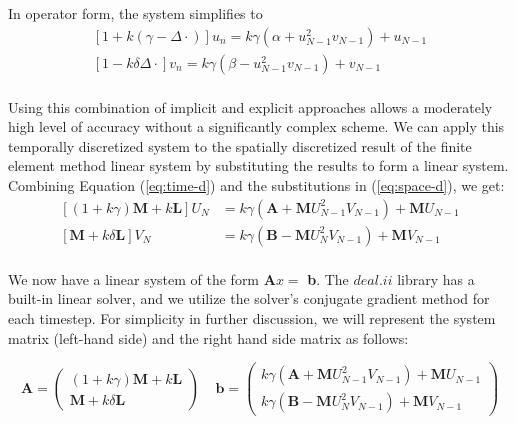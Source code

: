 \documentclass[12pt]{article}
\begin{document}
\noindent In operator form, the system simplifies to
\begin{equation}\label{eq:time-d}
\begin{aligned}
\left[1 + k\left(\gamma - \Delta\cdot\right)\right]u_n=  k\gamma\left(\alpha + u_{N-1}^2v_{N-1} \right) + u_{N-1} \\
\left[1 - k\delta\Delta\cdot\right] v_n=  k\gamma\left(\beta - u_{N-1}^2v_{N-1} \right) + v_{N-1} \\
\end{aligned}
\end{equation}

Using this combination of implicit and explicit approaches allows a moderately high level of accuracy without a significantly complex scheme. We can apply this temporally discretized system to the spatially discretized result of the finite element method linear system by substituting the results to form a linear system. Combining Equation (\ref{eq:time-d}) and the substitutions in (\ref{eq:space-d}), we get:
\begin{equation}
\begin{aligned}
\left[(1+k\gamma)\textbf{M} + k\textbf{L}\right] U_N&=  k\gamma\left(\textbf{A} + \textbf{M} U^2_{N-1}V_{N-1} \right) + \textbf{M}U_{N-1} \\
\left[\textbf{M} + k\delta\textbf{L}\right] V_N&=  k\gamma\left(\textbf{B} - \textbf{M} U^2_NV_{N-1} \right) + \textbf{M}V_{N-1} \\
\end{aligned}
\end{equation}

We now have a linear system of the form \textbf{A}$x=$ \textbf{b}. The $deal.ii$ library has a built-in linear solver, and we utilize the solver's conjugate gradient method for each timestep. For simplicity in further discussion, we will represent the system matrix (left-hand side) and the right hand side matrix as follows:

\begin{equation}
	\textbf{A} = \left(\begin{matrix} 
	(1+k\gamma)\textbf{M} + k\textbf{L} \\ 
	\textbf{M} + k\delta\textbf{L}
	\end{matrix}\right) ~~~~~
	\textbf{b} = \left(\begin{matrix} 
	k\gamma\left(\textbf{A} + \textbf{M} U^2_{N-1}V_{N-1} \right) + \textbf{M}U_{N-1} \\ 
	k\gamma\left(\textbf{B} - \textbf{M} U^2_NV_{N-1} \right) + \textbf{M}V_{N-1}
	\end{matrix}\right)
\end{equation} 
\end{document}

